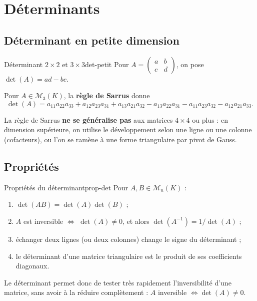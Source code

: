 \documentclass[theme=pringlea]{myrtille}
\begin{document}
\section{Déterminants}

\subsection{Déterminant en petite dimension}
\begin{myrdef}{Déterminant $2\times 2$ et $3\times 3$}{det-petit}
Pour $A = \begin{pmatrix} a & b \\ c & d \end{pmatrix}$, on pose $\det(A) = ad - bc$.

Pour $A \in \mathcal{M}_3(K)$, la \textbf{règle de Sarrus} donne
\[ \det(A) = a_{11}a_{22}a_{33} + a_{12}a_{23}a_{31} + a_{13}a_{21}a_{32} - a_{13}a_{22}a_{31} - a_{11}a_{23}a_{32} - a_{12}a_{21}a_{33}. \]
\end{myrdef}

\begin{warnbox}
La règle de Sarrus \textbf{ne se généralise pas} aux matrices $4\times 4$ ou plus : en dimension supérieure, on utilise le développement selon une ligne ou une colonne (cofacteurs), ou l'on se ramène à une forme triangulaire par pivot de Gauss.
\end{warnbox}

\subsection{Propriétés}
\begin{myrthm}{Propriétés du déterminant}{prop-det}
Pour $A, B \in \mathcal{M}_n(K)$ :
\begin{enumerate}
    \item $\det(AB) = \det(A)\det(B)$ ;
    \item $A$ est inversible $\iff$ $\det(A) \neq 0$, et alors $\det(A^{-1}) = 1/\det(A)$ ;
    \item échanger deux lignes (ou deux colonnes) change le signe du déterminant ;
    \item le déterminant d'une matrice triangulaire est le produit de ses coefficients diagonaux.
\end{enumerate}
\end{myrthm}

\begin{infobox}
Le déterminant permet donc de tester très rapidement l'inversibilité d'une matrice, sans avoir à la réduire complètement : $A$ inversible $\iff \det(A)\neq 0$.
\end{infobox}
\end{document}
